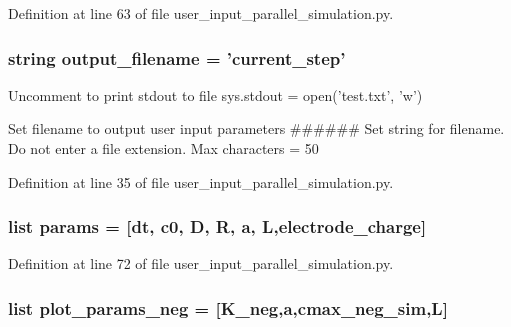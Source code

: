 Definition at line 63 of file user\-\_\-input\-\_\-parallel\-\_\-simulation.\-py.

\hypertarget{namespaceuser__input__parallel__simulation_ac0647ad8713153cc6b448750dbeb1b15}{
\subsubsection[{output\-\_\-filename}]{\setlength{\rightskip}{0pt plus 5cm}string output\-\_\-filename = 'current\-\_\-step'}}\label{namespaceuser__input__parallel__simulation_ac0647ad8713153cc6b448750dbeb1b15}


Uncomment to print stdout to file sys.\-stdout = open('test.\-txt', 'w') 

Set filename to output user input parameters \#\#\#\#\#\# Set string for filename. Do not enter a file extension. Max characters = 50 

Definition at line 35 of file user\-\_\-input\-\_\-parallel\-\_\-simulation.\-py.

\hypertarget{namespaceuser__input__parallel__simulation_ad4a342a882e80fb0b1b0a80df4b9321b}{
\subsubsection[{params}]{\setlength{\rightskip}{0pt plus 5cm}list params = \mbox{[}{\bf dt}, {\bf c0}, D, R, a, L,electrode\-\_\-charge\mbox{]}}}\label{namespaceuser__input__parallel__simulation_ad4a342a882e80fb0b1b0a80df4b9321b}


Definition at line 72 of file user\-\_\-input\-\_\-parallel\-\_\-simulation.\-py.

\hypertarget{namespaceuser__input__parallel__simulation_a0861e0e85d9d6139e0cc3cc1cc4fa692}{
\subsubsection[{plot\-\_\-params\-\_\-neg}]{\setlength{\rightskip}{0pt plus 5cm}list plot\-\_\-params\-\_\-neg = \mbox{[}{\bf K\-\_\-neg},a,{\bf cmax\-\_\-neg\-\_\-sim},L\mbox{]}}}\label{namespaceuser__input__parallel__simulation_a0861e0e85d9d6139e0cc3cc1cc4fa692}


